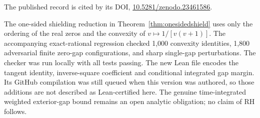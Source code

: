 The published record is cited by its DOI,
\href{https://doi.org/10.5281/zenodo.23461586}{10.5281/zenodo.23461586}.


The one-sided shielding reduction in
Theorem~\ref{thm:onesidedshield} uses only
the ordering of the real zeros and the
convexity of $v\mapsto1/[v(v+1)]$.
The accompanying exact-rational regression
checked 1,000 convexity identities,
1,800 adversarial finite zero-gap configurations,
and sharp single-gap perturbations. The checker
was run locally with all tests passing.
The new Lean file
encodes the tangent identity,
inverse-square coefficient and conditional
integrated gap margin. Its GitHub compilation
was still queued when this version was authored,
so those additions are not described as
Lean-certified here. The genuine time-integrated
weighted exterior-gap bound remains an open
analytic obligation; no claim of RH follows.


